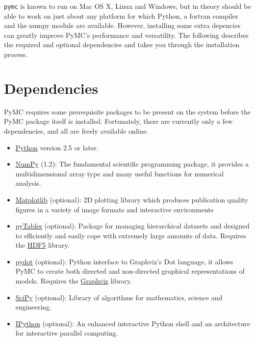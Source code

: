 


\texttt{pymc} is known to run on Mac OS X, Linux and Windows, but in theory should be 
able to work on just about any platform for which Python, a fortran compiler
and the numpy module are  available. However, installing some extra 
depencies can greatly improve PyMC's performance and versatility. 
The following describes the required and optional dependencies and takes you 
through the installation process.



\hypertarget{dependencies}{}
\section*{Dependencies}

PyMC requires some prerequisite packages to be present on the system before the 
PyMC package itself is installed. Fortunately, there are currently only a few 
dependencies, and all are freely available online.
\begin{itemize}
\item {} 
\href{http://www.python.org/.}{Python} version 2.5 or later.

\item {} 
\href{http://www.scipy.org/NumPy}{NumPy} (1.2): The fundamental scientific programming package, it provides a 
multidimensional array type and many useful functions for numerical analysis.

\item {} 
\href{http://matplotlib.sourceforge.net/}{Matplotlib} (optional): 2D plotting library which produces publication 
quality figures in a variety of image formats and interactive environments

\item {} 
\href{http://www.pytables.org/moin}{pyTables} (optional): Package for managing hierarchical datasets and 
designed to efficiently and easily cope with extremely large amounts of data.
Requires the \href{http://www.hdfgroup.org/HDF5/}{HDF5} library.

\item {} 
\href{http://code.google.com/p/pydot/}{pydot} (optional): Python interface to Graphviz's Dot language, it allows
PyMC to create both directed and non-directed graphical representations of models.
Requires the \href{http://www.graphviz.org/}{Graphviz} library.

\item {} 
\href{http://www.scipy.org/}{SciPy} (optional): Library of algorithms for mathematics, science 
and engineering.

\item {} 
\href{http://ipython.scipy.org/}{IPython} (optional): An enhanced interactive Python shell and an 
architecture for interactive parallel computing.

\end{itemize}

